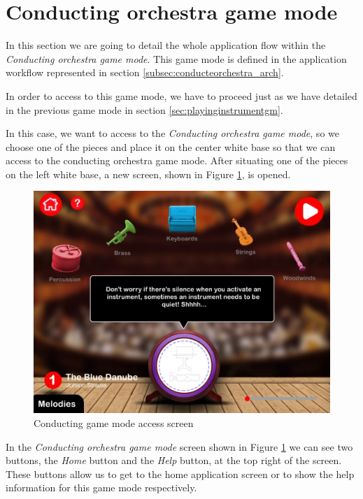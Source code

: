\section{Conducting orchestra game mode}
\label{sec:conductingorchestragm}

In this section we are going to detail the whole application flow within the \textit{Conducting orchestra game mode}. This game mode is defined in the application workflow represented in section \ref{subsec:conducteorchestra_arch}.

In order to access to this game mode, we have to proceed just as we have detailed in the previous game mode in section \ref{sec:playinginstrumentgm}.

In this case, we want to access to the \textit{Conducting orchestra game mode}, so we choose one of the pieces and place it on the center white base so that we can access to the conducting orchestra game mode. After situating one of the pieces on the left white base, a new screen, shown in Figure \ref{fig:conducting_home_screen}, is opened.

\begin{figure}[ht!]
	\centering
	\includegraphics[width=400pt]{graphics/use-case/conducting_home_screen.jpg}
	\caption{Conducting game mode access screen}
	\label{fig:conducting_home_screen}
\end{figure}

\FloatBarrier

In the \textit{Conducting orchestra game mode} screen shown in Figure \ref{fig:conducting_home_screen} we can see two buttons, the \textit{Home} button and the \textit{Help} button, at the top right of the screen. These buttons allow us to get to the home application screen or to show the help information for this game mode respectively.

